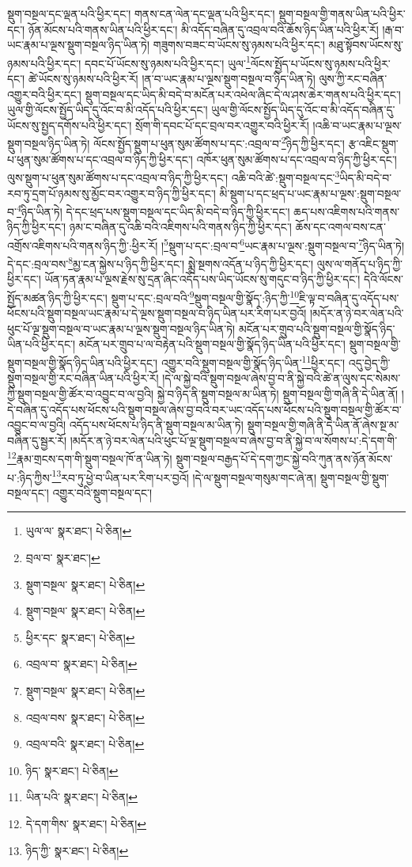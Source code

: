 སྡུག་བསྔལ་དང་ལྡན་པའི་ཕྱིར་དང་། གནས་ངན་ལེན་དང་ལྡན་པའི་ཕྱིར་དང་། སྡུག་བསྔལ་གྱི་གནས་ཡིན་པའི་ཕྱིར་དང་། ཉོན་མོངས་པའི་གནས་ཡིན་པའི་ཕྱིར་དང་། མི་འདོད་བཞིན་དུ་འབྲལ་བའི་ཆོས་ཉིད་ཡིན་པའི་ཕྱིར་རོ། །རྒ་བ་ཡང་རྣམ་པ་ལྔས་སྡུག་བསྔལ་ཉིད་ཡིན་ཏེ། གཟུགས་བཟང་བ་ཡོངས་སུ་ཉམས་པའི་ཕྱིར་དང་། མཐུ་སྟོབས་ཡོངས་སུ་ཉམས་པའི་ཕྱིར་དང་། དབང་པོ་ཡོངས་སུ་ཉམས་པའི་ཕྱིར་དང་། ཡུལ་\footnote{ཡུལ་ལ་  སྣར་ཐང་།  པེ་ཅིན། }ལོངས་སྤྱོད་པ་ཡོངས་སུ་ཉམས་པའི་ཕྱིར་དང་། ཚེ་ཡོངས་སུ་ཉམས་པའི་ཕྱིར་རོ། །ན་བ་ཡང་རྣམ་པ་ལྔས་སྡུག་བསྔལ་བ་ཉིད་ཡིན་ཏེ། ལུས་ཀྱི་རང་བཞིན་འགྱུར་བའི་ཕྱིར་དང་། སྡུག་བསྔལ་དང་ཡིད་མི་བདེ་བ་མངོན་པར་འཕེལ་ཞིང་དེ་ལ་ཤས་ཆེར་གནས་པའི་ཕྱིར་དང་། ཡུལ་གྱི་ལོངས་སྤྱོད་ཡིད་དུ་འོང་བ་མི་འདོད་པའི་ཕྱིར་དང་། ཡུལ་གྱི་ལོངས་སྤྱོད་ཡིད་དུ་འོང་བ་མི་འདོད་བཞིན་དུ་ཡོངས་སུ་སྤྱད་དགོས་པའི་ཕྱིར་དང་། སྲོག་གི་དབང་པོ་དང་བྲལ་བར་འགྱུར་བའི་ཕྱིར་རོ། །འཆི་བ་ཡང་རྣམ་པ་ལྔས་སྡུག་བསྔལ་ཉིད་ཡིན་ཏེ། ལོངས་སྤྱོད་སྡུག་པ་ཕུན་སུམ་ཚོགས་པ་དང་:འབྲལ་བ་\footnote{བྲལ་བ་  སྣར་ཐང་། }ཉིད་ཀྱི་ཕྱིར་དང་། རྩ་འཇིང་སྡུག་པ་ཕུན་སུམ་ཚོགས་པ་དང་འབྲལ་བ་ཉིད་ཀྱི་ཕྱིར་དང་། འཁོར་ཕུན་སུམ་ཚོགས་པ་དང་འབྲལ་བ་ཉིད་ཀྱི་ཕྱིར་དང་། ལུས་སྡུག་པ་ཕུན་སུམ་ཚོགས་པ་དང་འབྲལ་བ་ཉིད་ཀྱི་ཕྱིར་དང་། འཆི་བའི་ཚེ་:སྡུག་བསྔལ་དང་\footnote{སྡུག་བསྔལ་  སྣར་ཐང་།  པེ་ཅིན། }ཡིད་མི་བདེ་བ་རབ་ཏུ་དྲག་པོ་ཉམས་སུ་མྱོང་བར་འགྱུར་བ་ཉིད་ཀྱི་ཕྱིར་དང་། མི་སྡུག་པ་དང་ཕྲད་པ་ཡང་རྣམ་པ་ལྔས་:སྡུག་བསྔལ་བ་\footnote{སྡུག་བསྔལ་  སྣར་ཐང་།  པེ་ཅིན། }ཉིད་ཡིན་ཏེ། དེ་དང་ཕྲད་པས་སྡུག་བསྔལ་དང་ཡིད་མི་བདེ་བ་ཉིད་ཀྱི་ཕྱིར་དང་། ཆད་པས་འཇིགས་པའི་གནས་ཉིད་ཀྱི་ཕྱིར་དང་། ཉམ་ང་བཞིན་དུ་འཆི་བའི་འཇིགས་པའི་གནས་ཉིད་ཀྱི་ཕྱིར་དང་། ཆོས་དང་འགལ་བས་ངན་འགྲོས་འཇིགས་པའི་གནས་ཉིད་ཀྱི་:ཕྱིར་རོ། །\footnote{ཕྱིར་དང་  སྣར་ཐང་།  པེ་ཅིན། }སྡུག་པ་དང་:བྲལ་བ་\footnote{འབྲལ་བ་  སྣར་ཐང་།  པེ་ཅིན། }ཡང་རྣམ་པ་ལྔས་:སྡུག་བསྔལ་བ་\footnote{སྡུག་བསྔལ་  སྣར་ཐང་།  པེ་ཅིན། }ཉིད་ཡིན་ཏེ། དེ་དང་:བྲལ་བས་\footnote{འབྲལ་བས་  སྣར་ཐང་།  པེ་ཅིན། }མྱ་ངན་སྐྱེས་པ་ཉིད་ཀྱི་ཕྱིར་དང་། སྨྲེ་སྔགས་འདོན་པ་ཉིད་ཀྱི་ཕྱིར་དང་། ལུས་ལ་གནོད་པ་ཉིད་ཀྱི་ཕྱིར་དང་། ཡོན་ཏན་རྣམ་པ་ལྔས་རྗེས་སུ་དྲན་ཞིང་འདོད་པས་ཡིད་ཡོངས་སུ་གདུང་བ་ཉིད་ཀྱི་ཕྱིར་དང་། དེའི་ལོངས་སྤྱོད་མཚན་ཉིད་ཀྱི་ཕྱིར་དང་། སྡུག་པ་དང་:བྲལ་བའི་\footnote{འབྲལ་བའི་  སྣར་ཐང་།  པེ་ཅིན། }སྡུག་བསྔལ་གྱི་སྣོད་:ཉིད་ཀྱི་\footnote{ཉིད་  སྣར་ཐང་།  པེ་ཅིན། }ཇི་ལྟ་བ་བཞིན་དུ་འདོད་པས་ཕོངས་པའི་སྡུག་བསྔལ་ཡང་རྣམ་པ་དེ་ལྔས་སྡུག་བསྔལ་བ་ཉིད་ཡིན་པར་རིག་པར་བྱའོ། །མདོར་ན་ཉེ་བར་ལེན་པའི་ཕུང་པོ་ལྔ་སྡུག་བསྔལ་བ་ཡང་རྣམ་པ་ལྔས་སྡུག་བསྔལ་ཉིད་ཡིན་ཏེ། མངོན་པར་གྲུབ་པའི་སྡུག་བསྔལ་གྱི་སྣོད་ཉིད་ཡིན་པའི་ཕྱིར་དང་། མངོན་པར་གྲུབ་པ་ལ་བརྟེན་པའི་སྡུག་བསྔལ་གྱི་སྣོད་ཉིད་ཡིན་པའི་ཕྱིར་དང་། སྡུག་བསྔལ་གྱི་སྡུག་བསྔལ་གྱི་སྣོད་ཉིད་ཡིན་པའི་ཕྱིར་དང་། འགྱུར་བའི་སྡུག་བསྔལ་གྱི་སྣོད་ཉིད་ཡིན་\footnote{ཡིན་པའི་  སྣར་ཐང་།  པེ་ཅིན། }ཕྱིར་དང་། འདུ་བྱེད་ཀྱི་སྡུག་བསྔལ་གྱི་རང་བཞིན་ཡིན་པའི་ཕྱིར་རོ། །དེ་ལ་སྐྱེ་བའི་སྡུག་བསྔལ་ཞེས་བྱ་བ་ནི་སྐྱེ་བའི་ཚེ་ན་ལུས་དང་སེམས་ཀྱི་སྡུག་བསྔལ་གྱི་ཚོར་བ་འབྱུང་བ་ལ་བྱའི། སྐྱེ་བ་ཉིད་ནི་སྡུག་བསྔལ་མ་ཡིན་ཏེ། སྡུག་བསྔལ་གྱི་གཞི་ནི་དེ་ཡིན་ནོ། །དེ་བཞིན་དུ་འདོད་པས་ཕོངས་པའི་སྡུག་བསྔལ་ཞེས་བྱ་བའི་བར་ཡང་འདོད་པས་ཕོངས་པའི་སྡུག་བསྔལ་གྱི་ཚོར་བ་འབྱུང་བ་ལ་བྱའི། འདོད་པས་ཕོངས་པ་ཉིད་ནི་སྡུག་བསྔལ་མ་ཡིན་ཏེ། སྡུག་བསྔལ་གྱི་གཞི་ནི་དེ་ཡིན་ནོ་ཞེས་སྔ་མ་བཞིན་དུ་སྦྱར་རོ། །མདོར་ན་ཉེ་བར་ལེན་པའི་ཕུང་པོ་ལྔ་སྡུག་བསྔལ་བ་ཞེས་བྱ་བ་ནི་སྐྱེ་བ་ལ་སོགས་པ་:དེ་དག་གི་\footnote{དེ་དག་གིས་  སྣར་ཐང་།  པེ་ཅིན། }རྣམ་གྲངས་དག་གི་སྡུག་བསྔལ་ཁོ་ན་ཡིན་ཏེ། སྡུག་བསྔལ་བརྒྱད་པོ་དེ་དག་ཀྱང་སྐྱེ་བའི་ཀུན་ནས་ཉོན་མོངས་པ་:ཉིད་ཀྱིས་\footnote{ཉིད་ཀྱི་  སྣར་ཐང་།  པེ་ཅིན། }རབ་ཏུ་ཕྱེ་བ་ཡིན་པར་རིག་པར་བྱའོ། །དེ་ལ་སྡུག་བསྔལ་གསུམ་གང་ཞེ་ན། སྡུག་བསྔལ་གྱི་སྡུག་བསྔལ་དང་། འགྱུར་བའི་སྡུག་བསྔལ་དང་། 